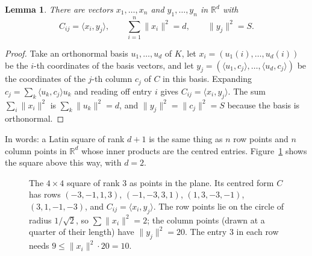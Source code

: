 \documentclass[11pt]{amsart}
\newtheorem{lemma}[theorem]{Lemma}
\theoremstyle{remark}
\newcommand{\R}{\mathbb{R}}
\begin{document}
\begin{lemma}\label{lem:factor}
There are vectors $x_1,\dots,x_n$ and $y_1,\dots,y_n$ in $\R^d$ with
\[
C_{ij}=\langle x_i,y_j\rangle,\qquad \sum_{i=1}^n\|x_i\|^2=d,\qquad \|y_j\|^2=S .
\]
\end{lemma}

\begin{proof}
Take an orthonormal basis $u_1,\dots,u_d$ of $K$, let $x_i=(u_1(i),\dots,u_d(i))$ be the $i$-th coordinates of the basis vectors, and let $y_j=(\langle u_1,c_j\rangle,\dots,\langle u_d,c_j\rangle)$ be the coordinates of the $j$-th column $c_j$ of $C$ in this basis. Expanding $c_j=\sum_k\langle u_k,c_j\rangle u_k$ and reading off entry $i$ gives $C_{ij}=\langle x_i,y_j\rangle$. The sum $\sum_i\|x_i\|^2$ is $\sum_k\|u_k\|^2=d$, and $\|y_j\|^2=\|c_j\|^2=S$ because the basis is orthonormal.
\end{proof}

In words: a Latin square of rank $d+1$ is the same thing as $n$ row points and $n$ column points in $\R^d$ whose inner products are the centred entries. Figure~\ref{fig:xor} shows the square above this way, with $d=2$.

\begin{figure}[ht]
\centering
{}
\caption{The $4\times4$ square of rank $3$ as points in the plane. Its centred form $C$ has rows $(-3,-1,1,3)$, $(-1,-3,3,1)$, $(1,3,-3,-1)$, $(3,1,-1,-3)$, and $C_{ij}=\langle x_i,y_j\rangle$. The row points lie on the circle of radius $1/\sqrt2$, so $\sum\|x_i\|^2=2$; the column points (drawn at a quarter of their length) have $\|y_j\|^2=20$. The entry $3$ in each row needs $9\le\|x_i\|^2\cdot20=10$.}
\label{fig:xor}
\end{figure}
\end{document}
